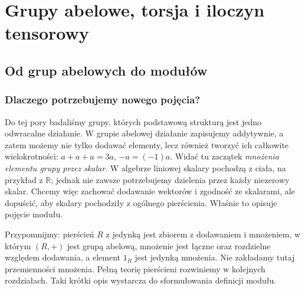 \setlength{\parskip}{0pt}
\chapter{Grupy abelowe, torsja i iloczyn tensorowy}
\label{aa:ch:grupy-abelowe}

\section{Od grup abelowych do modułów}
\label{aa:sec:wprowadzenie-moduly}

\subsection{Dlaczego potrzebujemy nowego pojęcia?}
Do tej pory badaliśmy grupy, których podstawową strukturą jest jedno
odwracalne działanie. W grupie abelowej działanie zapisujemy addytywnie,
a zatem możemy nie tylko dodawać elementy, lecz również tworzyć ich
całkowite wielokrotności: $a+a+a=3a$, $-a=(-1)a$.
Widać tu zaczątek \emph{mnożenia elementu grupy przez skalar}.
W algebrze liniowej skalary pochodzą z ciała, na przykład z $\mathbb R$;
jednak nie zawsze potrzebujemy dzielenia przez każdy niezerowy skalar.
Chcemy więc zachować dodawanie wektorów i zgodność ze skalarami,
ale dopuścić, aby skalary pochodziły z ogólnego pierścienia.
Właśnie to opisuje pojęcie modułu.

Przypomnijmy: pierścień $R$ z jedynką jest zbiorem z dodawaniem
i mnożeniem, w którym $(R,+)$ jest grupą abelową, mnożenie
jest łączne oraz rozdzielne względem dodawania, a element $1_R$
jest jedynką mnożenia. Nie zakładamy tutaj przemienności mnożenia.
Pełną teorię pierścieni rozwiniemy w kolejnych rozdziałach.
Taki krótki opis wystarcza do sformułowania definicji modułu.

